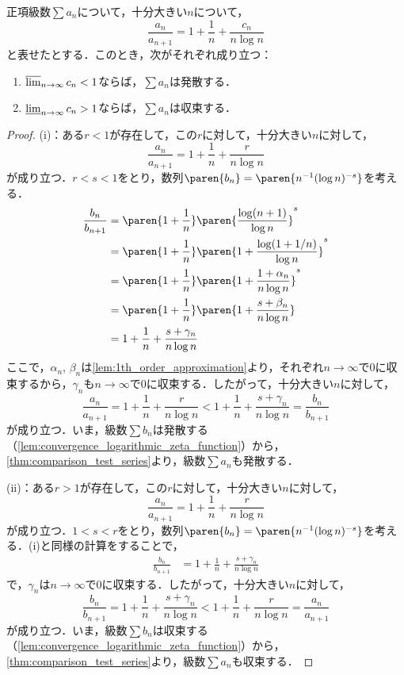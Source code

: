 \documentclass[a4paper,10pt]{ltjsarticle}
\begin{document}
\begin{MyTheorem}
  正項級数\(\sum a_n\)について，十分大きい\(n\)について，
  \[ \frac{a_n}{a_{n+1}} = 1 + \frac{1}{n} + \frac{c_n}{n\log n} \]
  と表せたとする．このとき，次がそれぞれ成り立つ：
  \begin{enumerate}
    \item \(\varlimsup_{n\to\infty}c_n < 1\)ならば，\(\sum a_n\)は発散する．
    \item \(\varliminf_{n\to\infty}c_n > 1\)ならば，\(\sum a_n\)は収束する．
  \end{enumerate}
\end{MyTheorem}
\begin{proof}
  (i)：ある\(r < 1\)が存在して，この\(r\)に対して，十分大きい\(n\)に対して，
  \[ \frac{a_n}{a_{n+1}} = 1 + \frac{1}{n} + \frac r{n\log n} \]
  が成り立つ．\(r < s < 1\)をとり，数列\(\paren{b_n} = \paren{n^{-1}(\log n)^{-s}}\)を考える．
  \begin{align*}
    \frac{b_n}{b_{n+1}} & = \paren{1 + \frac 1n}\paren{\frac{\log(n+1)}{\log n}}^s         \\
                        & = \paren{1 + \frac 1n}\paren{1 + \frac{\log(1 + 1/n)}{\log n}}^s \\
                        & = \paren{1 + \frac 1n}\paren{1 + \frac{1 + \alpha_n}{n\log n}}^s \\
                        & = \paren{1 + \frac 1n}\paren{1 + \frac{s + \beta_n}{n\log n}}    \\
                        & = 1 + \frac1n + \frac{s + \gamma_n}{n\log n}
  \end{align*}
  ここで，\(\alpha_n\), \(\beta_n\)は\cref{lem:1th_order_approximation}より，それぞれ\(n\to\infty\)で\(0\)に収束するから，\(\gamma_n\)も\(n\to\infty\)で\(0\)に収束する．したがって，十分大きい\(n\)に対して，
  \[ \frac{a_n}{a_{n+1}} = 1 + \frac{1}{n} + \frac r{n\log n} < 1 + \frac1n + \frac{s + \gamma_n}{n\log n} = \frac{b_n}{b_{n+1}} \]
  が成り立つ．いま，級数\(\sum b_n\)は発散する（\cref{lem:convergence_logarithmic_zeta_function}）から，\cref{thm:comparison_test_series}より，級数\(\sum a_n\)も発散する．

  (ii)：ある\(r > 1\)が存在して，この\(r\)に対して，十分大きい\(n\)に対して，
  \[ \frac{a_n}{a_{n+1}} = 1 + \frac{1}{n} + \frac r{n\log n} \]
  が成り立つ．\(1 < s < r\)をとり，数列\(\paren{b_n} = \paren{n^{-1}(\log n)^{-s}}\)を考える．(i)と同様の計算をすることで，
  \begin{align*}
    \frac{b_n}{b_{n+1}} & = 1 + \frac1n + \frac{s + \gamma_n}{n\log n}
  \end{align*}
  で，\(\gamma_n\)は\(n\to\infty\)で\(0\)に収束する．したがって，十分大きい\(n\)に対して，
  \[ \frac{b_n}{b_{n+1}} = 1 + \frac{1}{n} + \frac{s + \gamma_n}{n\log n} < 1 + \frac{1}{n} + \frac r{n\log n} = \frac{a_n}{a_{n+1}} \]
  が成り立つ．いま，級数\(\sum b_n\)は収束する（\cref{lem:convergence_logarithmic_zeta_function}）から，\cref{thm:comparison_test_series}より，級数\(\sum a_n\)も収束する．
\end{proof}
\end{document}
